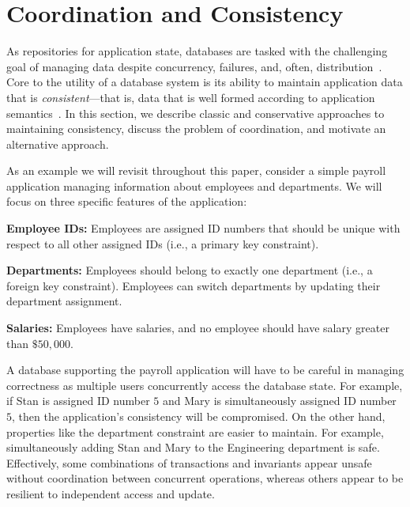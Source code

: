 
\section{Coordination and Consistency}
\label{sec:motivation}


As repositories for application state, databases are tasked with the
challenging goal of managing data despite concurrency, failures, and,
often, distribution~\cite{bernstein-book}. Core to the utility of a
database system is its ability to maintain application data that is
\textit{consistent}---that is, data that is well formed according to
application semantics~\cite{gray-virtues}. In this section, we 
describe classic and conservative approaches to maintaining
consistency, discuss the problem of coordination, and motivate an
alternative approach.

 As an example we will revisit throughout
this paper, consider a simple payroll application managing information
about employees and departments. We will focus on three specific
features of the application:
\begin{myitemize}
\item\textbf{Employee IDs:} Employees are assigned ID numbers that
  should be unique with respect to all other assigned IDs (i.e., a
  primary key constraint).
  \item\textbf{Departments:} Employees should belong to exactly one
  department (i.e., a foreign key constraint). Employees can switch
  departments by updating their department assignment.
\item\textbf{Salaries:} Employees have salaries, and no employee
  should have salary greater than $\$50,000$.
\end{myitemize}
A database supporting the payroll application will have to be careful
in managing correctness as multiple users concurrently access the
database state. For example, if Stan is assigned ID number $5$ and
Mary is simultaneously assigned ID number $5$, then the application's
consistency will be compromised. On the other hand, properties like
the department constraint are easier to maintain. For example,
simultaneously adding Stan and Mary to the Engineering department is
safe. Effectively, some combinations of transactions and invariants
appear unsafe without coordination between concurrent operations,
whereas others appear to be resilient to independent access and
update.


